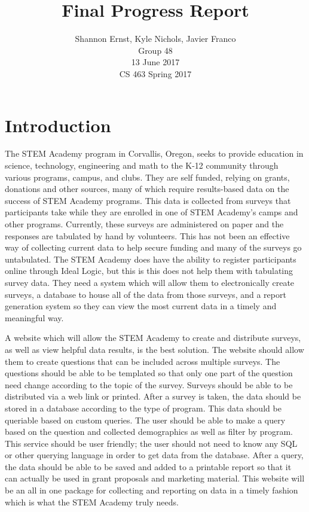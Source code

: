\documentclass[letterpaper,10pt,serif,draftclsnofoot,onecolumn,compsoc,titlepage]{IEEEtran}
\title{Final Progress Report}
\author{Shannon Ernst, Kyle Nichols, Javier Franco\\ Group 48 \\ 13 June 2017 \\ CS 463 Spring 2017}
\begin{document}
\maketitle
\begin{abstract}

\end{abstract}
\newpage
\tableofcontents
\newpage
\section{Introduction}
The STEM Academy program in Corvallis, Oregon, seeks to provide education in science, technology, engineering and math to the K-12 community through various programs, campus, and clubs.
They are self funded, relying on grants, donations and other sources, many of which require results-based data on the success of STEM Academy programs.
This data is collected from surveys that participants take while they are enrolled in one of STEM Academy's camps and other programs.
Currently, these surveys are administered on paper and the responses are tabulated by hand by volunteers.
This has not been an effective way of collecting current data to help secure funding and many of the surveys go untabulated.
The STEM Academy does have the ability to register participants online through Ideal Logic, but this is this does not help them with tabulating survey data.
They need a system which will allow them to electronically create surveys, a database to house all of the data from those surveys, and a report generation system so they can view the most current data in a timely and meaningful way.

A website which will allow the STEM Academy to create and distribute surveys, as well as view helpful data results, is the best solution.
The website should allow them to create questions that can be included across multiple surveys.
The questions should be able to be templated so that only one part of the question need change according to the topic of the survey.
Surveys should be able to be distributed via a web link or printed.
After a survey is taken, the data should be stored in a database according to the type of program.
This data should be queriable based on custom queries.
The user should be able to make a query based on the question and collected demographics as well as filter by program.
This service should be user friendly; the user should not need to know any SQL or other querying language in order to get data from the database.
After a query, the data should be able to be saved and added to a printable report so that it can actually be used in grant proposals and marketing material.
This website will be an all in one package for collecting and reporting on data in a timely fashion which is what the STEM Academy truly needs.
\end{document}

